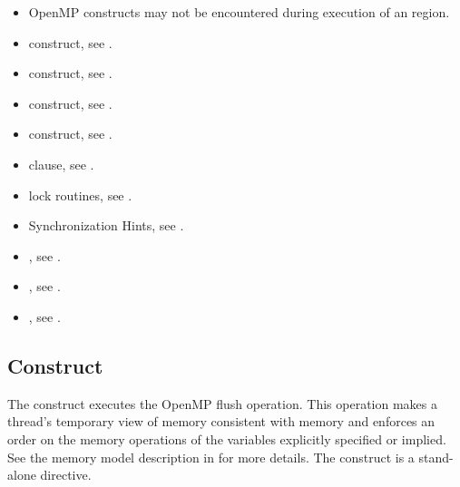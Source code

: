 \begin{itemize}
\item OpenMP constructs may not be encountered during execution of an
 region.
\end{itemize}


\crossreferences
\begin{itemize}
\item {} construct, see
.

\item {} construct, see
.

\item {} construct, see
.

\item {} construct, see
.

\item {} clause, see
.

\item lock routines, see
.

\item Synchronization Hints, see
.

\item {}, see
.

\item {}, see
.

\item {}, see
.

\end{itemize}









\subsection{ Construct}
\label{subsec:flush Construct}
\summary
The  construct executes the OpenMP flush operation. This operation makes a
thread's temporary view of memory consistent with memory and enforces an order on
the memory operations of the variables explicitly specified or implied. See the memory
model description in  for more details. The  construct is a
stand-alone directive.

